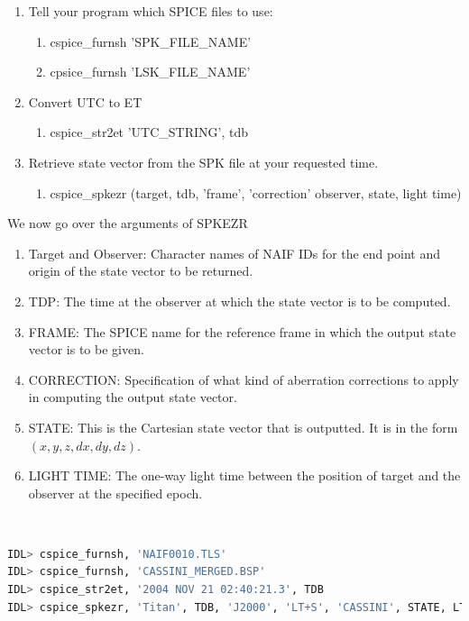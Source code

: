 \documentclass[crop=false,class=book]{standalone}
\begin{document}
\begin{enumerate}
    \item Tell your program which SPICE files to use:
    \begin{enumerate}
        \item cspice\_furnsh 'SPK\_FILE\_NAME'
        \item cpsice\_furnsh 'LSK\_FILE\_NAME'
    \end{enumerate}
    \item Convert UTC to ET
    \begin{enumerate}
        \item cspice\_str2et 'UTC\_STRING', tdb
    \end{enumerate}
    \item Retrieve state vector from the SPK file at your requested time.
    \begin{enumerate}
        \item cspice\_spkezr (target, tdb, 'frame', 'correction' observer, state, light time)
    \end{enumerate}
\end{enumerate}
We now go over the arguments of SPKEZR
\begin{enumerate}
    \item Target and Observer: Character names of NAIF IDs for the end point and origin of the state vector to be returned.
    \item TDP: The time at the observer at which the state vector is to be computed.
    \item FRAME: The SPICE name for the reference frame in which the output state vector is to be given.
    \item CORRECTION: Specification of what kind of aberration corrections to apply in computing the output state vector.
    \item STATE: This is the Cartesian state vector that is outputted. It is in the form $(x,y,z,dx,dy,dz)$. 
    \item LIGHT TIME: The one-way light time between the position of target and the observer at the specified epoch.
\end{enumerate}
\begin{example}
\
\begin{lstlisting}[language=bash,basicstyle=\footnotesize]
IDL> cspice_furnsh, 'NAIF0010.TLS'
IDL> cspice_furnsh, 'CASSINI_MERGED.BSP'
IDL> cspice_str2et, '2004 NOV 21 02:40:21.3', TDB
IDL> cspice_spkezr, 'Titan', TDB, 'J2000', 'LT+S', 'CASSINI', STATE, LT
\end{lstlisting}
\end{example}
\end{document}

